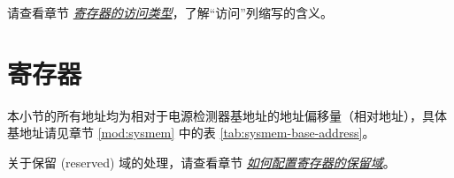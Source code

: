 \documentclass[main\_\_CN.tex]{subfiles}
\begin{document}
请查看章节 \hyperref[glossary-access-types]{\textit{寄存器的访问类型}}，了解“访问”列缩写的含义。






\newpage
\section{寄存器}

本小节的所有地址均为相对于电源检测器基地址的地址偏移量（相对地址），具体基地址请见章节 \ref{mod:sysmem} \textit{} 中的表 \ref{tab:sysmem-base-address}。

关于保留 (reserved) 域的处理，请查看章节 \hyperref[programming-reserved-field]{\textit{如何配置寄存器的保留域}}。


\end{document}
